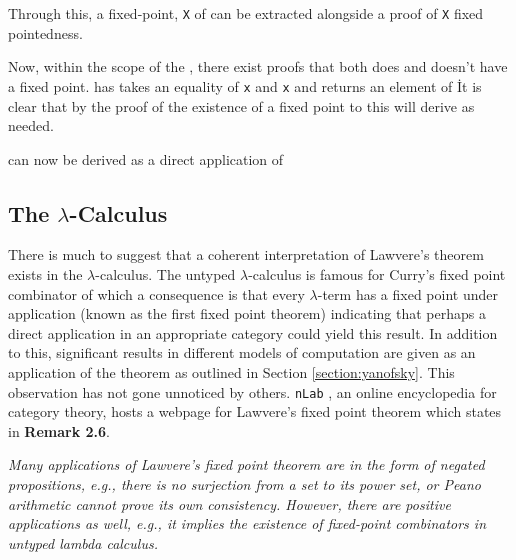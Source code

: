 Through this, a fixed-point, \verb|X| of  can be extracted alongside a
proof of \verb|X| fixed pointedness.


Now, within the scope of the , there exist proofs that
 both does and doesn't have a fixed point.
 has takes an equality of  \verb|x|
and \verb|x| and returns an element of \. It is clear that by
the proof of the existence of a fixed point to this will derive  as
needed.


 can now be derived as a direct application
of 

\begin{AgdaMultiCode}
\end{AgdaMultiCode}
\subsection{The $\lambda$-Calculus}
\label{quote:lambda}
There is much to suggest that a coherent interpretation of Lawvere's theorem
exists in the $\lambda$-calculus. The untyped $\lambda$-calculus is famous for
Curry's fixed point combinator of which a consequence is that
every $\lambda$-term has a fixed point under application (known as the first
fixed point theorem) indicating that perhaps a direct
application in an appropriate category could yield this result. In addition to
this, significant results in different models of computation are given as an
application of the theorem as outlined in Section \ref{section:yanofsky}. This observation has not
gone unnoticed by others. \verb|nLab| \cite{nlab:homepage}, an online encyclopedia
for category theory,  hosts a webpage for Lawvere's fixed point
theorem \cite{nlab:lawvere's_fixed_point_theorem} which states in \textbf{Remark 2.6}.

\begin{displayquote}
\textit{Many applications of Lawvere’s fixed point theorem are in the form of negated
propositions, e.g., there is no surjection from a set to its power set, or
Peano arithmetic cannot prove its own consistency. However, there are positive
applications as well, e.g., it implies the existence of fixed-point combinators
in untyped lambda calculus.}
\end{displayquote}

